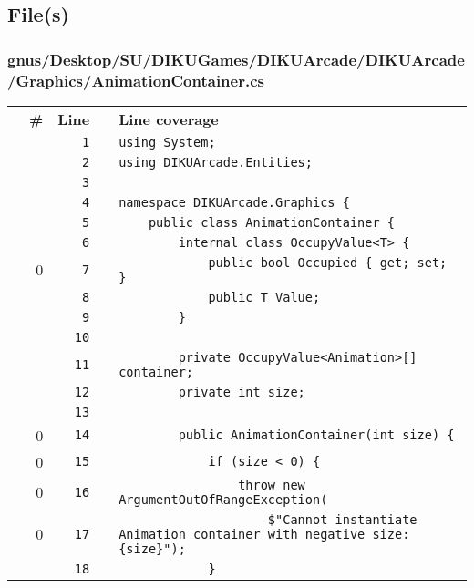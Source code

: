 \documentclass[a4paper,landscape,10pt]{article}
\begin{document}
\subsection{File(s)}
\subsubsection{gnus/Desktop/SU/DIKUGames/DIKUArcade/DIKUArcade/Graphics/AnimationContainer.cs}
\begin{longtable}[l]{lrrll}
\textbf{} & \textbf{\#} & \textbf{Line} & \textbf{} & \textbf{Line coverage}\\
\cellcolor{gray} &  & \verb~1~ & & \verb~using System;~\\
\cellcolor{gray} &  & \verb~2~ & & \verb~using DIKUArcade.Entities;~\\
\cellcolor{gray} &  & \verb~3~ & & \verb~~\\
\cellcolor{gray} &  & \verb~4~ & & \verb~namespace DIKUArcade.Graphics {~\\
\cellcolor{gray} &  & \verb~5~ & & \verb~    public class AnimationContainer {~\\
\cellcolor{gray} &  & \verb~6~ & & \verb~        internal class OccupyValue<T> {~\\
\cellcolor{red} & 0 & \verb~7~ & & \verb~            public bool Occupied { get; set; }~\\
\cellcolor{gray} &  & \verb~8~ & & \verb~            public T Value;~\\
\cellcolor{gray} &  & \verb~9~ & & \verb~        }~\\
\cellcolor{gray} &  & \verb~10~ & & \verb~~\\
\cellcolor{gray} &  & \verb~11~ & & \verb~        private OccupyValue<Animation>[] container;~\\
\cellcolor{gray} &  & \verb~12~ & & \verb~        private int size;~\\
\cellcolor{gray} &  & \verb~13~ & & \verb~~\\
\cellcolor{red} & 0 & \verb~14~ & & \verb~        public AnimationContainer(int size) {~\\
\cellcolor{red} & 0 & \verb~15~ & & \verb~            if (size < 0) {~\\
\cellcolor{red} & 0 & \verb~16~ & & \verb~                throw new ArgumentOutOfRangeException(~\\
\cellcolor{red} & 0 & \verb~17~ & & \verb~                    $"Cannot instantiate Animation container with negative size: {size}");~\\
\cellcolor{gray} &  & \verb~18~ & & \verb~            }~\\

\end{longtable}
\end{document}
